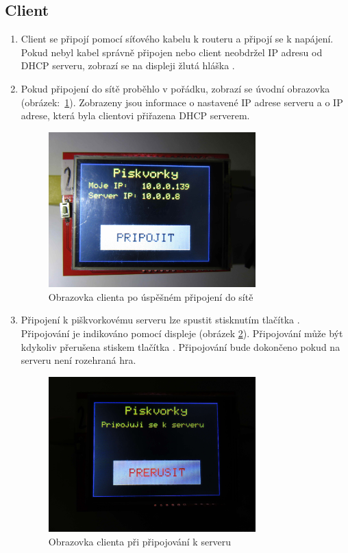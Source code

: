 \documentclass[a4paper,12pt, twoside]{article} %
\begin{document}
\subsection{Client}
\begin{enumerate}
\item Client se připojí pomocí síťového kabelu k routeru a připojí se k napájení. Pokud nebyl kabel správně připojen nebo client neobdržel IP adresu od DHCP serveru, zobrazí se na displeji žlutá hláška .

\item Pokud připojení do sítě proběhlo v pořádku, zobrazí se úvodní obrazovka (obrázek:~\ref{fig:faze1}).  Zobrazeny jsou informace o nastavené IP adrese serveru a o IP adrese, která byla clientovi přiřazena DHCP serverem.  
\begin{figure}[H]
\centering
\includegraphics[width=8cm]{img/foto/faze1.jpg}
\caption{\label{fig:faze1} Obrazovka clienta po úspěšném připojení do sítě}
\end{figure}

\item Připojení k piškvorkovému serveru lze spustit stisknutím tlačítka . Připojování je indikováno pomocí displeje (obrázek \ref{fig:faze2}). Připojování může být kdykoliv přerušena stiskem tlačítka . Připojování bude dokončeno pokud na serveru není rozehraná hra.
\begin{figure}[H]
\centering
\includegraphics[width=8cm]{img/foto/faze2.jpg}
\caption{\label{fig:faze2} Obrazovka clienta při připojování k serveru}
\end{figure}


\end{enumerate}
\end{document}
